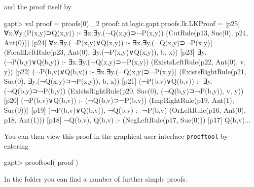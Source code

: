 \documentclass[a4paper,11pt]{article}
\newcommand{\cli}[1]{{\ttfamily {#1}}}
\begin{document}
\begin{appendix}
\begin{clilisting}
\end{clilisting}
%
and the proof itself by
%
\begin{clilisting}
gapt> val proof = proofs(0)._2
proof: at.logic.gapt.proofs.lk.LKProof =
[p25] ∀x.∀y.(P(x,y)⊃Q(x,y)) :- ∃x.∃y.(¬Q(x,y)⊃¬P(x,y))    (CutRule(p13, Suc(0), p24, Ant(0)))
[p24] ∀x.∃y.(¬P(x,y)∨Q(x,y)) :- ∃x.∃y.(¬Q(x,y)⊃¬P(x,y))    (ForallLeftRule(p23, Ant(0), ∃y.(¬P(x,y)∨Q(x,y)), b, x))
[p23] ∃y.(¬P(b,y)∨Q(b,y)) :- ∃x.∃y.(¬Q(x,y)⊃¬P(x,y))    (ExistsLeftRule(p22, Ant(0), v, y))
[p22] (¬P(b,v)∨Q(b,v)) :- ∃x.∃y.(¬Q(x,y)⊃¬P(x,y))    (ExistsRightRule(p21, Suc(0), ∃y.(¬Q(x,y)⊃¬P(x,y)), b, x))
[p21] (¬P(b,v)∨Q(b,v)) :- ∃y.(¬Q(b,y)⊃¬P(b,y))    (ExistsRightRule(p20, Suc(0), (¬Q(b,y)⊃¬P(b,y)), v, y))
[p20] (¬P(b,v)∨Q(b,v)) :- (¬Q(b,v)⊃¬P(b,v))    (ImpRightRule(p19, Ant(1), Suc(0)))
[p19] (¬P(b,v)∨Q(b,v)), ¬Q(b,v) :- ¬P(b,v)    (OrLeftRule(p16, Ant(0), p18, Ant(1)))
[p18] ¬Q(b,v), Q(b,v) :-     (NegLeftRule(p17, Suc(0)))
[p17] Q(b,v)...
\end{clilisting}
%
You can then view this proof in the graphical user interface \texttt{prooftool} by
entering
%
\begin{clilisting}
gapt> prooftool( proof )

\end{clilisting}
%
In the folder \cli{../examples/simple} you can find a number of further simple
proofs.

\end{appendix}

\vfill
\pagebreak



\end{document}
